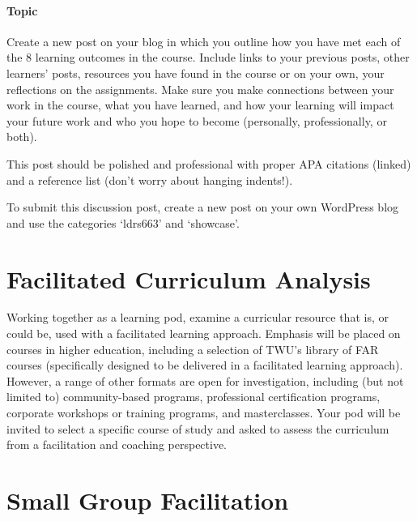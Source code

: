\documentclass[
]{book}
\begin{document}
\hypertarget{topic-2}{%
\paragraph*{Topic}\label{topic-2}}

Create a new post on your blog in which you outline how you have met each of the 8 learning outcomes in the course. Include links to your previous posts, other learners' posts, resources you have found in the course or on your own, your reflections on the assignments. Make sure you make connections between your work in the course, what you have learned, and how your learning will impact your future work and who you hope to become (personally, professionally, or both).

This post should be polished and professional with proper APA citations (linked) and a reference list (don't worry about hanging indents!).

To submit this discussion post, create a new post on your own WordPress blog and use the categories `ldrs663' and `showcase'.

\hypertarget{facilitated-curriculum-analysis}{%
\section*{Facilitated Curriculum Analysis}\label{facilitated-curriculum-analysis}}

Working together as a learning pod, examine a curricular resource that is, or could be, used with a facilitated learning approach. Emphasis will be placed on courses in higher education, including a selection of TWU's library of FAR courses (specifically designed to be delivered in a facilitated learning approach). However, a range of other formats are open for investigation, including (but not limited to) community-based programs, professional certification programs, corporate workshops or training programs, and masterclasses. Your pod will be invited to select a specific course of study and asked to assess the curriculum from a facilitation and coaching perspective.

\hypertarget{small-group-facilitation}{%
\section*{Small Group Facilitation}\label{small-group-facilitation}}
\end{document}
